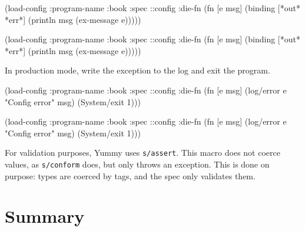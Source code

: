 \ifx\DEVICETYPE\MOBILE

\begin{english}
  \begin{clojure}
(load-config
 {:program-name :book
  :spec ::config
  :die-fn (fn [e msg]
            (binding [*out* *err*]
              (println msg
                (ex-message e))))})
  \end{clojure}
\end{english}

\else

\begin{english}
  \begin{clojure}
(load-config
 {:program-name :book
  :spec ::config
  :die-fn (fn [e msg]
            (binding [*out* *err*]
              (println msg (ex-message e))))})
  \end{clojure}
\end{english}

\fi

\noindent
In production mode, write the exception to the log and exit the program.


\ifx\DEVICETYPE\MOBILE

\begin{english}
  \begin{clojure}
(load-config
 {:program-name :book
  :spec ::config
  :die-fn (fn [e msg]
            (log/error e
              "Config error" msg)
            (System/exit 1))})
  \end{clojure}
\end{english}

\else

\begin{english}
  \begin{clojure}
(load-config
 {:program-name :book
  :spec ::config
  :die-fn (fn [e msg]
            (log/error e "Config error" msg)
            (System/exit 1))})
  \end{clojure}
\end{english}

\fi

For validation purposes, Yummy uses \verb|s/assert|. This macro does not coerce values, as \verb|s/conform| does, but only throws an exception. This is done on purpose: types are coerced by tags, and the spec only validates them.

\section{Summary}


